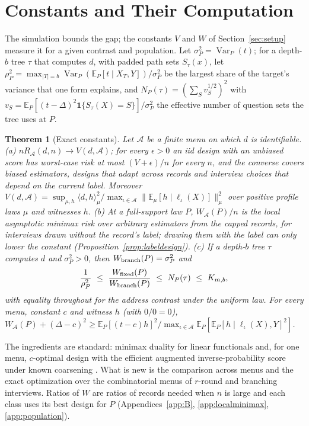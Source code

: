\documentclass{article}
\newtheorem{theorem}{Theorem}
\newcommand{\E}{\mathbb{E}}
\newcommand{\Var}{\operatorname{Var}}
\newcommand{\A}{\mathcal A}
\begin{document}
\section{Constants and Their Computation}\label{sec:general}\label{sec:population}
The simulation bounds the gap; the constants $V$ and $W$ of Section~\ref{sec:setup} measure it for a given contrast and population. Let $\sigma_P^2=\Var_P(t)$; for a depth-$b$ tree $\tau$ that computes $d$, with padded path sets $S_\tau(x)$, let $\rho_P^2=\max_{|T|=b}\Var_P(\E_P[t\mid X_T,Y])/\sigma_P^2$ be the largest share of the target's variance that one form explains, and $N_P(\tau)=(\sum_Sv_S^{1/2})^2$ with $v_S=\E_P[(t-\Delta)^2\mathbf 1\{S_\tau(X)=S\}]/\sigma_P^2$ the effective number of question sets the tree uses at $P$.

\begin{theorem}[Exact constants]\label{thm:char}\label{thm:bracket}
Let $\A$ be a finite menu on which $d$ is identifiable.
\textup{(a)} $nR_\A(d,n)\to V(d,\A)$; for every $\epsilon>0$ an iid design with an unbiased score has worst-case risk at most $(V+\epsilon)/n$ for every $n$, and the converse covers biased estimators, designs that adapt across records and interview choices that depend on the current label. Moreover $V(d,\A)=\sup_{\mu,h}\langle d,h\rangle_\mu^2/\max_{\iota\in\A}\|\E_\mu[h\mid\ell_\iota(X)]\|_\mu^2$ over positive profile laws $\mu$ and witnesses $h$.
\textup{(b)} At a full-support law $P$, $W_\A(P)/n$ is the local asymptotic minimax risk over arbitrary estimators from the capped records, for interviews drawn without the record's label; drawing them with the label can only lower the constant (Proposition~\ref{prop:labeldesign}).
\textup{(c)} If a depth-$b$ tree $\tau$ computes $d$ and $\sigma_P^2>0$, then $W_{\rm branch}(P)=\sigma_P^2$ and
\[
 \frac1{\rho_P^2}\ \le\ \frac{W_{\rm fixed}(P)}{W_{\rm branch}(P)}\ \le\ N_P(\tau)\ \le\ K_{m,b},
\]
with equality throughout for the address contrast under the uniform law. For every menu, constant $c$ and witness $h$ (with $0/0=0$), $W_\A(P)+(\Delta-c)^2\ge\E_P[(t-c)h]^2/\max_{\iota\in\A}\E_P[\E_P[h\mid\ell_\iota(X),Y]^2]$.
\end{theorem}
The ingredients are standard: minimax duality for linear functionals \citep{donoho1994,juditsky2009,polyanskiy2026} and, for one menu, $c$-optimal design with the efficient augmented inverse-probability score under known coarsening \citep{elfving1952,pukelsheim1993,robins1994,tsiatis2006}. What is new is the comparison across menus and the exact optimization over the combinatorial menus of $r$-round and branching interviews. Ratios of $W$ are ratios of records needed when $n$ is large and each class uses its best design for $P$ (Appendices~\ref{app:B}, \ref{app:localminimax}, \ref{app:population}).
\end{document}
